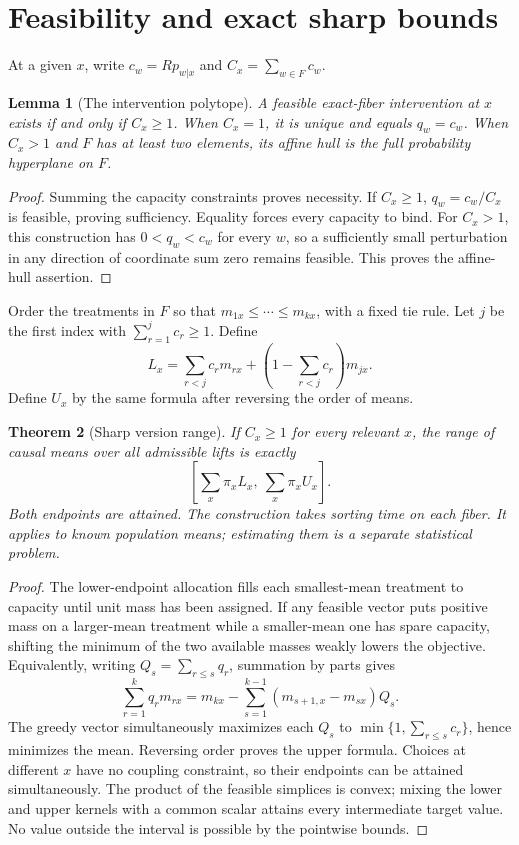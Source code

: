 \documentclass[11pt,a4paper]{article}
\newtheorem{theorem}{Theorem}[section]
\newtheorem{lemma}[theorem]{Lemma}
\theoremstyle{definition}
\theoremstyle{remark}
\begin{document}
\section{Feasibility and exact sharp bounds}
At a given $x$, write $c_w=R p_{w|x}$ and $C_x=\sum_{w\in F}c_w$.
\begin{lemma}[The intervention polytope]
A feasible exact-fiber intervention at $x$ exists if and only if $C_x\ge1$. When $C_x=1$, it is unique and equals $q_w=c_w$. When $C_x>1$ and $F$ has at least two elements, its affine hull is the full probability hyperplane on $F$.
\end{lemma}
\begin{proof}
Summing the capacity constraints proves necessity. If $C_x\ge1$, $q_w=c_w/C_x$ is feasible, proving sufficiency. Equality forces every capacity to bind. For $C_x>1$, this construction has $0<q_w<c_w$ for every $w$, so a sufficiently small perturbation in any direction of coordinate sum zero remains feasible. This proves the affine-hull assertion.
\end{proof}
Order the treatments in $F$ so that $m_{1x}\le\cdots\le m_{kx}$, with a fixed tie rule. Let $j$ be the first index with $\sum_{r=1}^j c_r\ge1$. Define
\[
 L_x=\sum_{r<j}c_r m_{rx}
                 +\left(1-\sum_{r<j}c_r\right)m_{jx}.
\]
Define $U_x$ by the same formula after reversing the order of means.
\begin{theorem}[Sharp version range]
If $C_x\ge1$ for every relevant $x$, the range of causal means over all admissible lifts is exactly
\[
 \left[\sum_x\pi_x L_x,\ \sum_x\pi_x U_x\right].
\]
Both endpoints are attained. The construction takes sorting time on each fiber. It applies to known population means; estimating them is a separate statistical problem.
\end{theorem}
\begin{proof}
The lower-endpoint allocation fills each smallest-mean treatment to capacity until unit mass has been assigned. If any feasible vector puts positive mass on a larger-mean treatment while a smaller-mean one has spare capacity, shifting the minimum of the two available masses weakly lowers the objective. Equivalently, writing $Q_s=\sum_{r\le s}q_r$, summation by parts gives
\[
 \sum_{r=1}^k q_r m_{rx}
   =m_{kx}-\sum_{s=1}^{k-1}(m_{s+1,x}-m_{sx})Q_s.
\]
The greedy vector simultaneously maximizes each $Q_s$ to
$\min\{1,\sum_{r\le s}c_r\}$, hence minimizes the mean. Reversing order proves the upper formula. Choices at different $x$ have no coupling constraint, so their endpoints can be attained simultaneously. The product of the feasible simplices is convex; mixing the lower and upper kernels with a common scalar attains every intermediate target value. No value outside the interval is possible by the pointwise bounds.
\end{proof}
\end{document}
